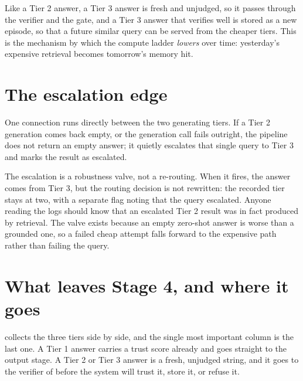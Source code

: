 Like a Tier 2 answer, a Tier 3 answer is fresh and unjudged, so it passes through the
verifier and the gate, and a Tier 3 answer that verifies well is stored as a new episode,
so that a future similar query can be served from the cheaper tiers. This is the
mechanism by which the compute ladder \emph{lowers} over time: yesterday's expensive
retrieval becomes tomorrow's memory hit.

\section{The escalation edge}
\label{sec:tiers-escalation}

One connection runs directly between the two generating tiers. If a Tier 2 generation
comes back empty, or the generation call fails outright, the pipeline does not return an
empty answer; it quietly escalates that single query to Tier 3 and marks the result as
escalated.

\begin{pitfall}
The escalation is a robustness valve, not a re-routing. When it fires, the answer comes
from Tier 3, but the routing decision is not rewritten: the recorded tier stays at two,
with a separate flag noting that the query escalated. Anyone reading the logs should know
that an escalated Tier 2 result was in fact produced by retrieval. The valve exists
because an empty zero-shot answer is worse than a grounded one, so a failed cheap attempt
falls forward to the expensive path rather than failing the query.
\end{pitfall}

\section{What leaves Stage 4, and where it goes}
\label{sec:tiers-exit}

 collects the three tiers side by side, and the single most important
column is the last one. A Tier 1 answer carries a trust score already and goes straight to
the output stage. A Tier 2 or Tier 3 answer is a fresh, unjudged string, and it goes to the
verifier of  before the system will trust it, store it, or refuse it.

